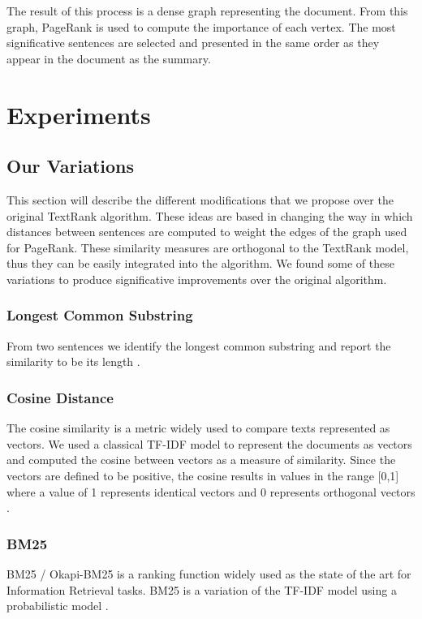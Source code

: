 \documentclass{llncs}
\begin{document}
The result of this process is a dense graph representing the document. From this graph, PageRank is used to compute the importance of each vertex. The most significative sentences are selected and presented in the same order as they appear in the document as the summary.


\section{Experiments}

\subsection{Our Variations}
This section will describe the different modifications that we propose over the original TextRank algorithm. These ideas are based in changing the way in which distances between sentences are computed to weight the edges of the graph used for PageRank. These similarity measures are orthogonal to the TextRank model, thus they can be easily integrated into the algorithm. We found some of these variations to produce significative improvements over the original algorithm.

\subsubsection{Longest Common Substring}
From two sentences we identify the longest common substring and report the similarity to be its length \cite{gusfield}.

\subsubsection{Cosine Distance}
The cosine similarity is a metric widely used to compare texts represented as vectors. We used a classical TF-IDF model to represent the documents as vectors and computed the cosine between vectors as a measure of similarity. Since the vectors are defined to be positive, the cosine results in values in the range [0,1] where a value of 1 represents identical vectors and 0 represents orthogonal vectors \cite{singhal}.

\subsubsection{BM25}
BM25 / Okapi-BM25 is a ranking function widely used as the state of the art for Information Retrieval tasks. BM25 is a variation of the TF-IDF model using a probabilistic model \cite{robertson}.
\end{document}
